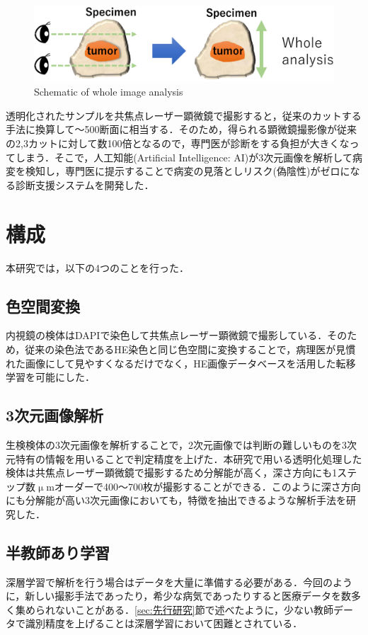 \begin{figure}[H]
	\centering
	\includegraphics[width=0.9\linewidth]{fig/chapter1/whole_image_analysis}
	\caption{Schematic of whole image analysis}
	\label{fig:wholeimageanalysis}
\end{figure}

透明化されたサンプルを共焦点レーザー顕微鏡で撮影すると，従来のカットする手法に換算して〜500断面に相当する．そのため，得られる顕微鏡撮影像が従来の2,3カットに対して数100倍となるので，専門医が診断をする負担が大きくなってしまう．そこで，人工知能(Artificial Intelligence: AI)が3次元画像を解析して病変を検知し，専門医に提示することで病変の見落としリスク(偽陰性)がゼロになる診断支援システムを開発した．

\section{構成}
本研究では，以下の4つのことを行った．

\subsection*{色空間変換}
内視鏡の検体はDAPIで染色して共焦点レーザー顕微鏡で撮影している．そのため，従来の染色法であるHE染色と同じ色空間に変換することで，病理医が見慣れた画像にして見やすくなるだけでなく，HE画像データベースを活用した転移学習を可能にした．

\subsection*{3次元画像解析}
生検検体の3次元画像を解析することで，2次元画像では判断の難しいものを3次元特有の情報を用いることで判定精度を上げた．本研究で用いる透明化処理した検体は共焦点レーザー顕微鏡で撮影するため分解能が高く，深さ方向にも1ステップ数$\upmu$mオーダーで400〜700枚が撮影することができる．このように深さ方向にも分解能が高い3次元画像においても，特徴を抽出できるような解析手法を研究した．

\subsection*{半教師あり学習}
深層学習で解析を行う場合はデータを大量に準備する必要がある．今回のように，新しい撮影手法であったり，希少な病気であったりすると医療データを数多く集められないことがある．\ref{sec:先行研究}節で述べたように，少ない教師データで識別精度を上げることは深層学習において困難とされている．

